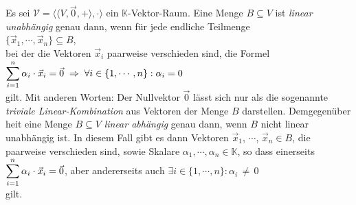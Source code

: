 \begin{Definition} \lb
Es sei $\mathcal{V} = \bigl\langle \langle V, \vec{0}, + \rangle, \cdot \bigr\rangle$ ein $\mathbb{K}$-Vektor-Raum.  
Eine Menge $B \subseteq V$ ist {\emph{\color{blue}linear unabh\"{a}ngig}} genau dann, wenn 
f\"{u}r jede endliche Teilmenge
\\[0.2cm]
\hspace*{1.3cm}
$\bigl\{ \vec{x}_1, \cdots, \vec{x}_n \bigr\} \subseteq B$,
\\[0.2cm]
bei der die Vektoren $\vec{x}_i$ {\color{red}paarweise verschieden} sind, die Formel
\\[0.2cm]
\hspace*{1.3cm}
$\displaystyle \sum\limits_{i=1}^n \alpha_i \cdot \vec{x}_i = \vec{0} \;\Rightarrow\; \forall i \in \{1,\cdots,n\}: \alpha_i = 0$
\\[0.2cm]
gilt.  Mit anderen Worten:  Der Nullvektor $\vec{0}$ l\"{a}sst sich nur als die sogenannte
{\emph{\color{blue}triviale Linear-Kombination}} aus Vektoren der Menge $B$ darstellen.  Demgegen\"{u}ber hei\3t eine
Menge $B \subseteq V$ {\emph{\color{blue}linear abh\"{a}ngig}} genau dann, wenn $B$ nicht linear unabh\"{a}ngig ist.  In
diesem Fall gibt es dann Vektoren $\vec{x}_1$, $\cdots$, $\vec{x}_n \in B$, die paarweise
verschieden sind, sowie Skalare $\alpha_1,\cdots,\alpha_n \in \mathbb{K}$, so dass einerseits
\\[0.2cm]
\hspace*{1.3cm}
$\displaystyle\sum\limits_{i=1}^n \alpha_i \cdot \vec{x}_i = \vec{0}$, \quad aber andererseits auch \quad
$\exists i \in \{1,\cdots,n\}: \alpha_i \,\not=\, 0$
\\[0.2cm]
gilt.  
\eoxs
\end{Definition}

